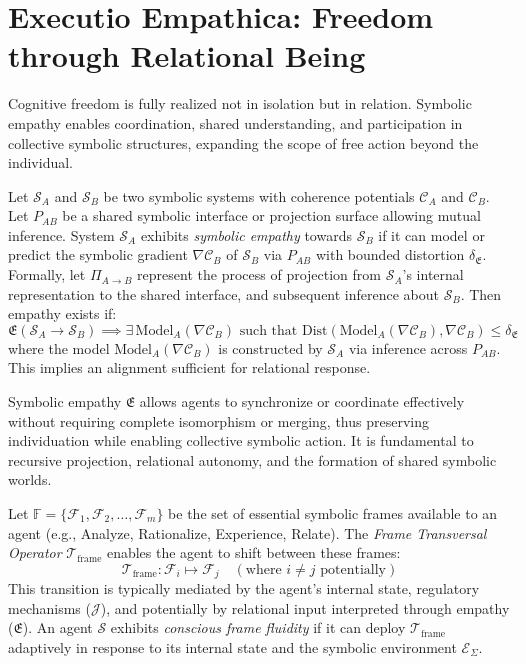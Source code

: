 \section{Executio Empathica: Freedom through Relational Being}
\label{sec:bk9_executio_empathica}
Cognitive freedom is fully realized not in isolation but in relation. Symbolic empathy enables coordination, shared understanding, and participation in collective symbolic structures, expanding the scope of free action beyond the individual.
\begin{definition}
\label{definition:bk9_symbolic_empathy}
Let $\mathcal{S}_A$ and $\mathcal{S}_B$ be two symbolic systems with coherence potentials $\mathcal{C}_A$ and $\mathcal{C}_B$. Let $P_{AB}$ be a shared symbolic interface or projection surface allowing mutual inference. System $\mathcal{S}_A$ exhibits \emph{symbolic empathy} towards $\mathcal{S}_B$ if it can model or predict the symbolic gradient $\nabla \mathcal{C}_B$ of $\mathcal{S}_B$ via $P_{AB}$ with bounded distortion $\delta_{\mathfrak{E}}$. Formally, let $\Pi_{A \to B}$ represent the process of projection from $\mathcal{S}_A$'s internal representation to the shared interface, and subsequent inference about $\mathcal{S}_B$. Then empathy exists if:
\[
\mathfrak{E}(\mathcal{S}_A \to \mathcal{S}_B) \implies \exists \, \text{Model}_A(\nabla \mathcal{C}_B) \text{ such that } \text{Dist}(\text{Model}_A(\nabla \mathcal{C}_B), \nabla \mathcal{C}_B) \le \delta_{\mathfrak{E}}
\]
where the model $\text{Model}_A(\nabla \mathcal{C}_B)$ is constructed by $\mathcal{S}_A$ via inference across $P_{AB}$. This implies an alignment sufficient for relational response.
\end{definition}
\begin{remark}
\label{remark:bk9_preserving_individuality}
Symbolic empathy $\mathfrak{E}$ allows agents to synchronize or coordinate effectively without requiring complete isomorphism or merging, thus preserving individuation while enabling collective symbolic action. It is fundamental to recursive projection, relational autonomy, and the formation of shared symbolic worlds.
\end{remark}
\begin{definition}
\label{definition:bk9_frame_transversal_operator}
Let $\mathbb{F} = \{\mathcal{F}_1, \mathcal{F}_2, \dots, \mathcal{F}_m\}$ be the set of essential symbolic frames available to an agent (e.g., Analyze, Rationalize, Experience, Relate). The \emph{Frame Transversal Operator} $\mathcal{T}_{\text{frame}}$ enables the agent to shift between these frames:
\[
\mathcal{T}_{\text{frame}} : \mathcal{F}_i \mapsto \mathcal{F}_j \quad (\text{where } i \ne j \text{ potentially})
\]
This transition is typically mediated by the agent's internal state, regulatory mechanisms ($\mathcal{J}$), and potentially by relational input interpreted through empathy ($\mathfrak{E}$). An agent $\mathcal{S}$ exhibits \emph{conscious frame fluidity} if it can deploy $\mathcal{T}_{\text{frame}}$ adaptively in response to its internal state and the symbolic environment $\mathcal{E}_\Sigma$.
\end{definition}
